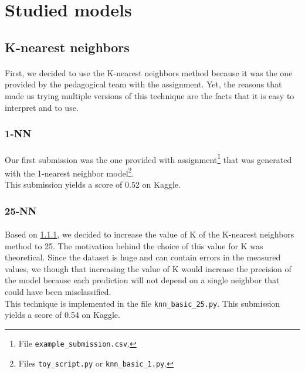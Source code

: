 \documentclass[a4paper, 11pt, oneside]{article}
\begin{document}

\section{Studied models} \label{sec:models}


\subsection{K-nearest neighbors}
\paragraph{}First, we decided to use the K-nearest neighbors method because it was the one provided by the pedagogical team with the assignment. Yet, the reasons that made us trying multiple versions of this technique are the facts that it is easy to interpret and to use.

\subsubsection{1-NN} \label{subsubsec:1NN}
\paragraph{}Our first submission was the one provided with assignment\footnote{File \texttt{example\_submission.csv}.} that was generated with the 1-nearest neighbor model\footnote{Files \texttt{toy\_script.py} or \texttt{knn\_basic\_1.py}.}.\\
This submission yields a score of 0.52 on Kaggle.

\subsubsection{25-NN} \label{subsubsec:25NN}
\paragraph{}Based on \ref{subsubsec:1NN}, we decided to increase the value of K of the K-nearest neighbors method to 25. The motivation behind the choice of this value for K was theoretical. Since the dataset is huge and can contain errors in the measured values, we though that increasing the value of K would increase the precision of the model because each prediction will not depend on a single neighbor that could have been misclassified.\\
This technique is implemented in the file \texttt{knn\_basic\_25.py}. This submission yields a score of 0.54 on Kaggle.
\end{document}
